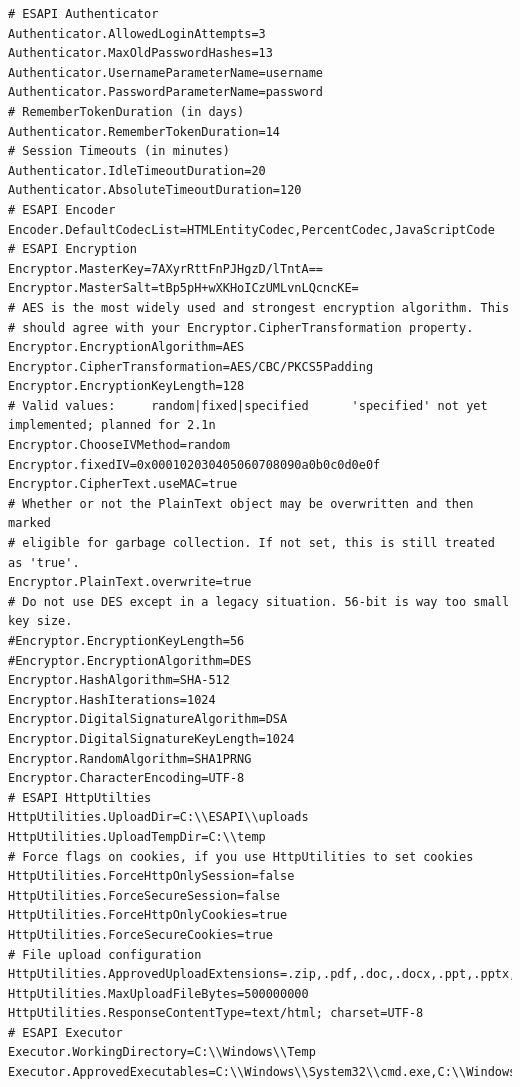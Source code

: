 \begin{lstlisting}
# ESAPI Authenticator
Authenticator.AllowedLoginAttempts=3
Authenticator.MaxOldPasswordHashes=13
Authenticator.UsernameParameterName=username
Authenticator.PasswordParameterName=password
# RememberTokenDuration (in days)
Authenticator.RememberTokenDuration=14
# Session Timeouts (in minutes)
Authenticator.IdleTimeoutDuration=20
Authenticator.AbsoluteTimeoutDuration=120
# ESAPI Encoder
Encoder.DefaultCodecList=HTMLEntityCodec,PercentCodec,JavaScriptCode
# ESAPI Encryption
Encryptor.MasterKey=7AXyrRttFnPJHgzD/lTntA==
Encryptor.MasterSalt=tBp5pH+wXKHoICzUMLvnLQcncKE=
# AES is the most widely used and strongest encryption algorithm. This
# should agree with your Encryptor.CipherTransformation property.
Encryptor.EncryptionAlgorithm=AES
Encryptor.CipherTransformation=AES/CBC/PKCS5Padding
Encryptor.EncryptionKeyLength=128
# Valid values:		random|fixed|specified		'specified' not yet implemented; planned for 2.1n
Encryptor.ChooseIVMethod=random
Encryptor.fixedIV=0x000102030405060708090a0b0c0d0e0f
Encryptor.CipherText.useMAC=true
# Whether or not the PlainText object may be overwritten and then marked
# eligible for garbage collection. If not set, this is still treated as 'true'.
Encryptor.PlainText.overwrite=true
# Do not use DES except in a legacy situation. 56-bit is way too small key size.
#Encryptor.EncryptionKeyLength=56
#Encryptor.EncryptionAlgorithm=DES
Encryptor.HashAlgorithm=SHA-512
Encryptor.HashIterations=1024
Encryptor.DigitalSignatureAlgorithm=DSA
Encryptor.DigitalSignatureKeyLength=1024
Encryptor.RandomAlgorithm=SHA1PRNG
Encryptor.CharacterEncoding=UTF-8
# ESAPI HttpUtilties
HttpUtilities.UploadDir=C:\\ESAPI\\uploads
HttpUtilities.UploadTempDir=C:\\temp
# Force flags on cookies, if you use HttpUtilities to set cookies
HttpUtilities.ForceHttpOnlySession=false
HttpUtilities.ForceSecureSession=false
HttpUtilities.ForceHttpOnlyCookies=true
HttpUtilities.ForceSecureCookies=true
# File upload configuration
HttpUtilities.ApprovedUploadExtensions=.zip,.pdf,.doc,.docx,.ppt,.pptx,.tar,.gz,.tgz,.rar,.war,.jar,.ear,.xls,.rtf,.properties,.java,.class,.txt,.xml,.jsp,.jsf,.exe,.dll
HttpUtilities.MaxUploadFileBytes=500000000
HttpUtilities.ResponseContentType=text/html; charset=UTF-8
# ESAPI Executor
Executor.WorkingDirectory=C:\\Windows\\Temp
Executor.ApprovedExecutables=C:\\Windows\\System32\\cmd.exe,C:\\Windows\\System32\\runas.exe

\end{lstlisting}
